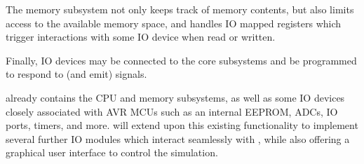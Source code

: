 The memory subsystem not only keeps track of memory contents, but also limits access
to the available memory space, and handles \ac{IO} mapped registers which
trigger interactions with some \ac{IO} device when read or written.

Finally, \ac{IO} devices may be connected to the core subsystems and be programmed
to respond to (and emit) signals.

\simavr already contains the \ac{CPU} and memory subsystems, as well as some
\ac{IO} devices closely associated with \ac{AVR} \acp{MCU} such as an internal \ac{EEPROM},
\acp{ADC}, \ac{IO} ports, timers, and more. \qsimavr will extend upon this existing functionality to
implement several further \ac{IO} modules which interact seamlessly with \simavr, while also offering a
graphical user interface to control the simulation.
